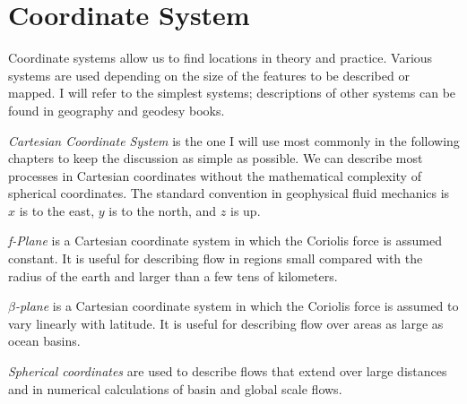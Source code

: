 \section{Coordinate System}
Coordinate systems allow us to find
locations in theory and practice. Various systems are used depending
on the size of the features to be described or mapped. I will refer to
the simplest systems; descriptions of other systems can be found in
geography and geodesy books.
\begin{enumerate}

\vitem\textit{Cartesian Coordinate System} is the one I will use most commonly in the
following chapters to keep the discussion as simple as possible. We
can describe most processes in Cartesian coordinates without the
mathematical complexity of spherical coordinates. The standard
convention in geophysical fluid mechanics is $x$ is to the east, $y$
is to the north, and $z$ is up.

\textit{f-Plane} is a
Cartesian coordinate system in which the Coriolis force is assumed
constant. It is useful for describing flow in regions small compared
with the radius of the earth and larger than a few tens of kilometers.

\textit{$\beta$-plane} is
a Cartesian coordinate system in which the Coriolis force is assumed
to vary linearly with latitude. It is useful for describing flow over
areas as large as ocean basins.

\vitem\textit{Spherical coordinates} are used to describe flows that
extend over large distances and in numerical calculations of basin and
global scale flows.
\end{enumerate}

